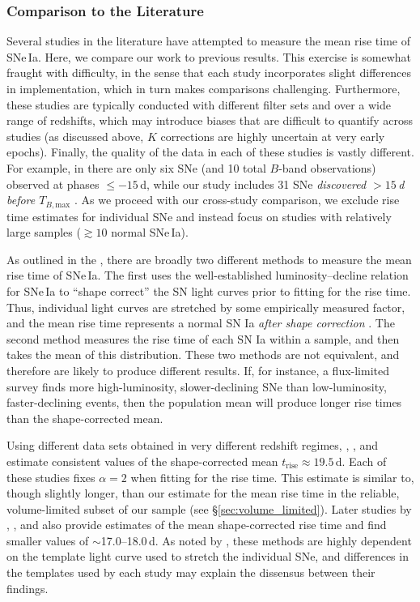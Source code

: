 \documentclass[twocolumn]{./aastex63}
\newcommand{\trise}{$t_\mathrm{rise}$}
\newcommand{\tbmax}{$T_{B,\mathrm{max}}$}
\begin{document}
\subsubsection{Comparison to the Literature}

Several studies in the literature have attempted to measure the mean rise time
of SNe\,Ia. Here, we compare our work to previous results. This exercise is
somewhat fraught with difficulty, in the sense that each study incorporates
slight differences in implementation, which in turn makes comparisons
challenging. Furthermore, these studies are typically conducted with different
filter sets and over a wide range of redshifts, which may introduce biases
that are difficult to quantify across studies (as discussed above, $K$
corrections are highly uncertain at very early epochs). Finally, the quality
of the data in each of these studies is vastly different. For example, in
\citet{Riess99a} there are only six SNe (and 10 total $B$-band observations)
observed at phases $\le -15$\,d, while our study includes 31 SNe
\textit{discovered $> 15$\,d before \tbmax} \citep{Yao19}. As we proceed with
our cross-study comparison, we exclude rise time estimates for individual SNe
and instead focus on studies with relatively large samples ($\gtrsim 10$
normal SNe\,Ia).

As outlined in the , there are broadly two different
methods to measure the mean rise time of SNe\,Ia. The first uses the
well-established luminosity--decline relation for SNe\,Ia \citep{Phillips93}
to ``shape correct'' the SN light curves prior to fitting for the rise time.
Thus, individual light curves are stretched by some empirically measured
factor, and the mean rise time represents a normal SN Ia \textit{after shape
correction} \citep[e.g.,][]
{Riess99a,Aldering00,Conley06,Hayden10,Ganeshalingam11,Gonzalez-Gaitan12}. The
second method measures the rise time of each SN Ia within a sample, and then
takes the mean of this distribution. These two methods are not equivalent, and
therefore are likely to produce different results. If, for instance, a
flux-limited survey finds more high-luminosity, slower-declining SNe than
low-luminosity, faster-declining events, then the population mean will produce
longer rise times than the shape-corrected mean.

Using different data sets obtained in very different redshift regimes,
\citet{Riess99a}, \citet{Aldering00}, and \citet{Conley06} estimate consistent
values of the shape-corrected mean \trise$ \approx 19.5$\,d. Each of these
studies fixes $\alpha = 2$ when fitting for the rise time. This
estimate is similar to, though slightly longer, than our estimate for the mean
rise time in the reliable, volume-limited subset of our sample (see
\S\ref{sec:volume_limited}). Later studies by \citet{Hayden10},
\citet{Ganeshalingam11}, and \citet{Gonzalez-Gaitan12} also provide estimates
of the mean shape-corrected rise time and find smaller values of
$\sim$17.0--18.0\,d. As noted by \citeauthor{Hayden10}, these methods are
highly dependent on the template light curve used to stretch the individual
SNe, and differences in the templates used by each study may explain the
dissensus between their findings.
\end{document}
